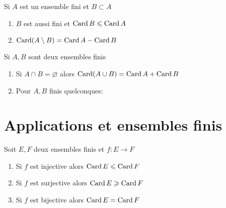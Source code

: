 \begin{frame}



Si $A$ est un ensemble fini et $B \subset A$
\begin{enumerate}
  \item<1-> $B$ est aussi fini et $\mathop{\text{Card}}\nolimits B \leqslant \mathop{\text{Card}}\nolimits A$
  \item<2-> $\mathop{\text{Card}}\nolimits (A \setminus B) = \mathop{\text{Card}}\nolimits A - \mathop{\text{Card}}\nolimits B$
\end{enumerate}

\pause
\pause 
\bigskip

Si $A, B$ sont deux ensembles finis 
\begin{enumerate}

  \item<3-> Si $A \cap B = \varnothing$ alors $\mathop{\text{Card}}\nolimits (A \cup B) = \mathop{\text{Card}}\nolimits A + \mathop{\text{Card}}\nolimits B$

  \item<4-> Pour $A,B$ finis quelconques:
\pause\pause
{}
\end{enumerate}

\end{frame}


\section{Applications et ensembles finis}


\begin{frame}

Soit $E,F$ deux ensembles finis et $f : E \to F$
\begin{proposition}
\begin{enumerate}
  \item<1-> \label{it:bij1} Si $f$ est injective alors $\mathop{\text{Card}}\nolimits E \leqslant \mathop{\text{Card}}\nolimits F$
  \item<2-> \label{it:bij2} Si $f$ est surjective alors $\mathop{\text{Card}}\nolimits E \geqslant \mathop{\text{Card}}\nolimits F$
  \item<3-> \label{it:bij3} Si $f$ est bijective alors $\mathop{\text{Card}}\nolimits E = \mathop{\text{Card}}\nolimits F$
\end{enumerate}
\end{proposition}
\end{frame}



